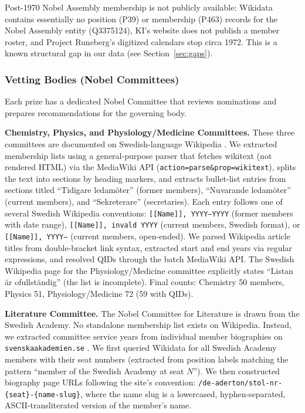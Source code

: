 \documentclass[11pt]{article}
\begin{document}
Post-1970 Nobel Assembly membership is not publicly available: Wikidata contains essentially no position (P39) or membership (P463) records for the Nobel Assembly entity (Q3375124), KI's website does not publish a member roster, and Project Runeberg's digitized calendars stop circa 1972. This is a known structural gap in our data (see Section~\ref{sec:gaps}).

\subsubsection{Vetting Bodies (Nobel Committees)}
\label{sec:data-vetting}

Each prize has a dedicated Nobel Committee that reviews nominations and prepares recommendations for the governing body.

\textbf{Chemistry, Physics, and Physiology/Medicine Committees.} These three committees are documented on Swedish-language Wikipedia \citep{NobelCommitteeChemistry,NobelCommitteePhysics,NobelCommitteePhysiology}. We extracted membership lists using a general-purpose parser that fetches wikitext (not rendered HTML) via the MediaWiki API (\texttt{action=parse\&prop=wikitext}), splits the text into sections by heading markers, and extracts bullet-list entries from sections titled ``Tidigare ledam\"oter'' (former members), ``Nuvarande ledam\"oter'' (current members), and ``Sekreterare'' (secretaries). Each entry follows one of several Swedish Wikipedia conventions: \texttt{[[Name]], YYYY--YYYY} (former members with date range), \texttt{[[Name]], invald YYYY} (current members, Swedish format), or \texttt{[[Name]], YYYY--} (current members, open-ended). We parsed Wikipedia article titles from double-bracket link syntax, extracted start and end years via regular expressions, and resolved QIDs through the batch MediaWiki API. The Swedish Wikipedia page for the Physiology/Medicine committee explicitly states ``Listan \"ar ofullst\"andig'' (the list is incomplete). Final counts: Chemistry 50 members, Physics 51, Physiology/Medicine 72 (59 with QIDs).

\textbf{Literature Committee.} The Nobel Committee for Literature is drawn from the Swedish Academy. No standalone membership list exists on Wikipedia. Instead, we extracted committee service years from individual member biographies on \texttt{svenskaakademien.se} \citep{Ledamotsregister}. We first queried Wikidata for all Swedish Academy members with their seat numbers (extracted from position labels matching the pattern ``member of the Swedish Academy at seat $N$''). We then constructed biography page URLs following the site's convention: \texttt{/de-aderton/stol-nr-\{seat\}-\{name-slug\}}, where the name slug is a lowercased, hyphen-separated, ASCII-transliterated version of the member's name.
\end{document}
